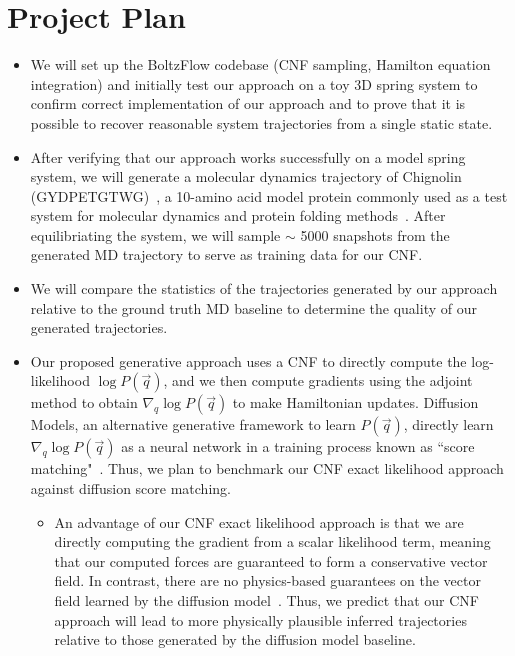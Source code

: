 \documentclass[a4paper,11pt]{article}
\begin{document}
\section {Project Plan}
\begin{itemize}
    \item We will set up the BoltzFlow codebase (CNF sampling, Hamilton equation integration) and initially test our approach on a toy 3D spring system to confirm correct implementation of our approach and to prove that it is possible to recover reasonable system trajectories from a single static state.
    
    \item After verifying that our approach works successfully on a model spring system, we will generate a molecular dynamics trajectory of Chignolin (GYDPETGTWG)~\cite{honda2004}, a 10-amino acid model protein commonly used as a test system for molecular dynamics and protein folding methods~\cite{satoh2006}. After equilibriating the system, we will sample $\sim$ 5000 snapshots from the generated MD trajectory to serve as training data for our CNF.
    
    \item We will compare the statistics of the trajectories generated by our approach relative to the ground truth MD baseline to determine the quality of our generated trajectories.
    
    \item Our proposed generative approach uses a CNF to directly compute the log-likelihood $\log{P(\vec{q})}$, and we then compute gradients using the adjoint method to obtain $\nabla_q\log{P(\vec{q})}$ to make Hamiltonian updates. Diffusion Models, an alternative generative framework to learn $P(\vec{q})$, directly learn $\nabla_q\log{P(\vec{q})}$ as a neural network in a training process known as ``score matching"~\cite{song2021,arts2023}. Thus, we plan to benchmark our CNF exact likelihood approach against diffusion score matching. 

    \begin{itemize}
        \item An advantage of our CNF exact likelihood approach is that we are directly computing the gradient from a scalar likelihood term, meaning that our computed forces are guaranteed to form a conservative vector field. In contrast, there are no physics-based guarantees on the vector field learned by the diffusion model~\cite{arts2023}. Thus, we predict that our CNF approach will lead to more physically plausible inferred trajectories relative to those generated by the diffusion model baseline.


\end{itemize}
\end{itemize}
\end{document}
